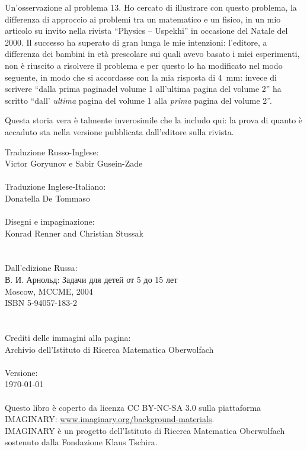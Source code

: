 \null\vfill
\begin{note}{Un'osservazione al problema 13.}
	Ho cercato di illustrare con questo problema, la differenza di approccio ai problemi tra un matematico e un fisico, in un mio articolo su invito nella rivista \enquote{Physics -- Uspekhi} in occasione del Natale del 2000. Il successo ha superato di gran lunga le mie intenzioni: l’editore, a differenza dei bambini in età prescolare sui quali avevo basato i miei esperimenti,
non è riuscito a risolvere il problema e per questo lo ha modificato nel modo seguente, in modo che si accordasse con la mia risposta di \SI{4}{\mm}: invece di scrivere \enquote{dalla prima paginadel volume 1 all'ultima pagina del volume 2} ha scritto \enquote{dall' \emph{ultima} pagina del volume 1 alla \emph{prima} pagina del volume 2}.

	Questa storia vera è talmente inverosimile che la includo qui: la prova di quanto è accaduto sta nella versione pubblicata dall’editore sulla rivista.
\end{note}
\clearpage
\null\vfill
\noindent
Traduzione Russo-Inglese:\\
\null\quad Victor Goryunov e Sabir Gusein-Zade\\
\\
\noindent
Traduzione Inglese-Italiano:\\
\null\quad Donatella De Tommaso\\
\\
Disegni e impaginazione:\\
\null\quad Konrad Renner and Christian Stussak\\
\\
\\
Dall'edizione Russa:\\
\null\quad \textrussian{В. И. Арнольд: Задачи для детей от 5 до 15 лет}\\
\null\quad Moscow, MCCME, 2004\\
\null\quad ISBN 5-94057-183-2\\
\\
\\
Crediti delle immagini alla pagina:\\
\null\quad Archivio dell'Istituto di Ricerca Matematica Oberwolfach\\
\\
Versione:\\
\null\quad \today\\
\\
Questo libro è coperto da licenza CC BY-NC-SA 3.0 sulla piattaforma IMAG\-I\-NARY: \href{http://www.imaginary.org/background-materials}{www.imaginary.org/background-materials}.\\
IMAGINARY è un progetto dell'Istituto di Ricerca Matematica Oberwolfach sostenuto dalla Fondazione Klaus Tschira.

